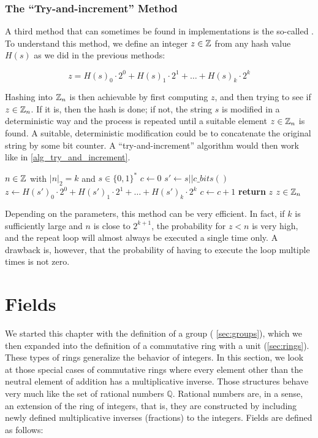 \subsubsection{The ``Try-and-increment'' Method}\label{def:try_and_increment_hash}

A third method that can sometimes be found in implementations is the so-called . To understand this method, we define an integer $z\in\mathbb{Z}$ from any hash value $H(s)$ as we did in the previous methods:

\begin{equation}
z = H(s)_0\cdot 2^0 + H(s)_1\cdot 2^1 + \ldots + H(s)_{k}\cdot 2^{k}
\end{equation}

Hashing into $\Z_n$ is then achievable by first computing $z$, and then trying to see if $z\in\mathbb{Z}_n$. If it is, then the hash is done; if not, the string $s$ is modified in a deterministic way and the process is repeated until a suitable element $z\in\mathbb{Z}_n$ is found. A suitable, deterministic modification could be to concatenate the original string by some bit counter. A ``try-and-increment'' algorithm would then work like in \algname{} \ref{alg_try_and_increment}.
\begin{algorithm}\caption{Hash-to-$\Z_n$}
\label{alg_try_and_increment}
\begin{algorithmic}[0]
\Require $n \in \mathbb{Z}$ with $|n|_2=k$ and $s\in\{0,1\}^*$
\State $c \gets 0$
\Repeat
\State $s' \gets s||c\_bits()$
\State $z \gets H(s')_0\cdot 2^0 + H(s')_1\cdot 2^1 + \ldots + H(s')_{k}\cdot 2^{k}$
\State $c\gets c+1$
\State \textbf{return} $z$
\EndProcedure
\Ensure $ z\in \mathbb{Z}_n$
\end{algorithmic}
\end{algorithm}

Depending on the parameters, this method can be very efficient. In fact, if $k$ is sufficiently large and $n$ is close to $2^{k+1}$, the probability for $z<n$ is very high, and the repeat loop will almost always be executed a single time only. A drawback is, however, that the probability of having to execute the loop multiple times is not zero.

\section{Fields}\label{sec:fields}
We started this chapter with the definition of a group (\secname{} \ref{sec:groups}), which we then expanded into the definition of a commutative ring with a unit (\secname \ref{sec:rings}). These types of rings generalize the behavior of integers. In this section, we look at those special cases of commutative rings where every element other than the neutral element of addition has a multiplicative inverse. Those structures behave very much like the set of rational numbers $\mathbb{Q}$. Rational numbers are, in a sense, an extension of the ring of integers, that is, they are constructed by including newly defined multiplicative inverses (fractions) to the integers. Fields are defined as follows:

